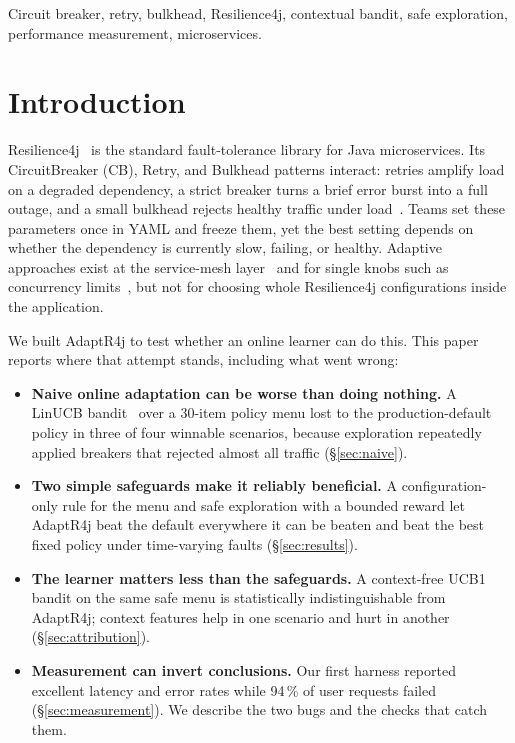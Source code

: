 \documentclass[journal]{IEEEtran}
\newcommand{\adaptr}{AdaptR4j\xspace}
\newcommand{\rFJ}{Resilience4j\xspace}
\begin{document}
\begin{IEEEkeywords}
Circuit breaker, retry, bulkhead, Resilience4j, contextual bandit, safe exploration,
performance measurement, microservices.
\end{IEEEkeywords}

\section{Introduction}
\label{sec:intro}

\rFJ~\cite{resilience4j} is the standard fault-tolerance library for Java microservices.
Its CircuitBreaker (CB), Retry, and Bulkhead patterns interact: retries amplify load on a
degraded dependency, a strict breaker turns a brief error burst into a full outage, and a
small bulkhead rejects healthy traffic under load~\cite{sedghpour2022,meiklejohn2022}.
Teams set these parameters once in YAML and freeze them, yet the best setting depends on
whether the dependency is currently slow, failing, or healthy. Adaptive approaches exist at
the service-mesh layer~\cite{sedghpour2023,sun2024} and for single knobs such as concurrency
limits~\cite{netflixlimits,envoyadaptive}, but not for choosing whole \rFJ configurations
inside the application.

We built \adaptr to test whether an online learner can do this. This paper reports where that
attempt stands, including what went wrong:

\begin{itemize}
\item \textbf{Naive online adaptation can be worse than doing nothing.} A LinUCB
  bandit~\cite{li2010} over a 30-item policy menu lost to the production-default policy in three
  of four winnable scenarios, because exploration repeatedly applied breakers that rejected
  almost all traffic (\S\ref{sec:naive}).
\item \textbf{Two simple safeguards make it reliably beneficial.} A configuration-only rule for
  the menu and safe exploration with a bounded reward let \adaptr beat the default everywhere
  it can be beaten and beat the best fixed policy under time-varying faults
  (\S\ref{sec:results}).
\item \textbf{The learner matters less than the safeguards.} A context-free UCB1 bandit on the
  same safe menu is statistically indistinguishable from \adaptr; context features help in one
  scenario and hurt in another (\S\ref{sec:attribution}).
\item \textbf{Measurement can invert conclusions.} Our first harness reported excellent latency
  and error rates while 94\,\% of user requests failed (\S\ref{sec:measurement}). We describe the
  two bugs and the checks that catch them.
\end{itemize}
\end{document}
